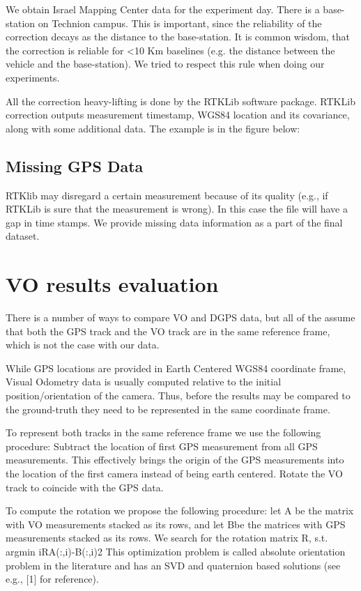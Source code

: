 \documentclass{report}
\begin{document}
We obtain Israel Mapping Center data for the experiment day.  There is
a base-station on Technion campus.  This is important, since the
reliability of the correction decays as the distance to the
base-station.  It is common wisdom, that the correction is reliable
for <10 Km baselines (e.g. the distance between the vehicle and the
base-station).  We tried to respect this rule when doing our
experiments.

All the correction heavy-lifting is done by the RTKLib software
package.  RTKLib correction outputs measurement timestamp, WGS84
location and its covariance, along with some additional data.  The
example is in the figure below:

\subsection{Missing GPS Data}

RTKlib may disregard a certain measurement because of its quality
(e.g., if RTKLib is sure that the measurement is wrong).  In this case
the file will have a gap in time stamps.  We provide missing data
information as a part of the final dataset.

\section{VO results evaluation}

There is a number of ways to compare VO and DGPS data, but all of the assume that both the GPS track and the VO track are in the same reference frame, which is not the case with our data.

While GPS locations are provided in Earth Centered WGS84 coordinate frame,  Visual Odometry data is usually computed relative to the initial position/orientation of the camera.  Thus, before the results may be compared to the ground-truth they need to be represented in the same coordinate frame.

To represent both tracks in the same reference frame we use the following procedure:
Subtract the location of first GPS measurement from all GPS measurements.  This effectively brings the origin of the GPS measurements into the location of the first camera instead of being earth centered.
Rotate the VO track to coincide with the GPS data.

To compute the rotation we propose the following procedure: let A be the matrix with VO measurements stacked as its rows, and let Bbe the matrices with GPS measurements stacked as its rows.  We search for the rotation matrix R, s.t. 
argmin iRA(:,i)-B(:,i)2 
This optimization problem is called absolute orientation problem in the literature and has an SVD and quaternion based solutions (see e.g., [1] for reference).
\end{document}
